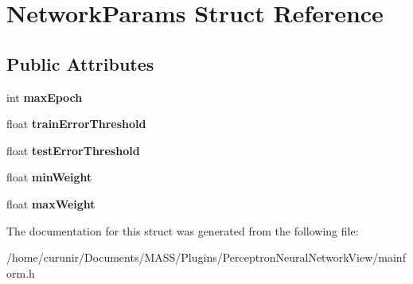 \hypertarget{struct_network_params}{}\section{Network\+Params Struct Reference}
\label{struct_network_params}
\subsection*{Public Attributes}
\begin{DoxyCompactItemize}
\item 
int {\bfseries max\+Epoch}\hypertarget{struct_network_params_a6a4d36a5e9c3f72e79ad94c9c919d4fc}{}\label{struct_network_params_a6a4d36a5e9c3f72e79ad94c9c919d4fc}

\item 
float {\bfseries train\+Error\+Threshold}\hypertarget{struct_network_params_a592d5c7199126660efcd5c08b1d47c07}{}\label{struct_network_params_a592d5c7199126660efcd5c08b1d47c07}

\item 
float {\bfseries test\+Error\+Threshold}\hypertarget{struct_network_params_ac8724964355a382767bfcf97e6cade9c}{}\label{struct_network_params_ac8724964355a382767bfcf97e6cade9c}

\item 
float {\bfseries min\+Weight}\hypertarget{struct_network_params_a42f00ee3de2b89324804ad4f57fdc9f4}{}\label{struct_network_params_a42f00ee3de2b89324804ad4f57fdc9f4}

\item 
float {\bfseries max\+Weight}\hypertarget{struct_network_params_a57964e4d96787f96a11c9c4f7d988995}{}\label{struct_network_params_a57964e4d96787f96a11c9c4f7d988995}

\end{DoxyCompactItemize}


The documentation for this struct was generated from the following file\+:\begin{DoxyCompactItemize}
\item 
/home/curunir/\+Documents/\+M\+A\+S\+S/\+Plugins/\+Perceptron\+Neural\+Network\+View/mainform.\+h\end{DoxyCompactItemize}
